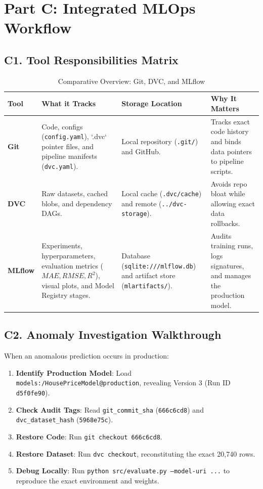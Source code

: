 \documentclass[11pt,a4paper]{article}
\begin{document}
\section{Part C: Integrated MLOps Workflow}

\subsection{C1. Tool Responsibilities Matrix}

\begin{table}[htbp]
\centering
\small
\caption{Comparative Overview: Git, DVC, and MLflow}
\begin{tabularx}{\textwidth}{l X X X}
\toprule
\textbf{Tool} & \textbf{What it Tracks} & \textbf{Storage Location} & \textbf{Why It Matters} \\
\midrule
\textbf{Git} & Code, configs (\texttt{config.yaml}), `.dvc` pointer files, and pipeline manifests (\texttt{dvc.yaml}). & Local repository (\texttt{.git/}) and GitHub. & Tracks exact code history and binds data pointers to pipeline scripts. \\
\textbf{DVC} & Raw datasets, cached blobs, and dependency DAGs. & Local cache (\texttt{.dvc/cache}) and remote (\texttt{../dvc-storage}). & Avoids repo bloat while allowing exact data rollbacks. \\
\textbf{MLflow} & Experiments, hyperparameters, evaluation metrics ($MAE, RMSE, R^2$), visual plots, and Model Registry stages. & Database (\texttt{sqlite:///mlflow.db}) and artifact store (\texttt{mlartifacts/}). & Audits training runs, logs signatures, and manages the production model. \\
\bottomrule
\end{tabularx}
\end{table}

\subsection{C2. Anomaly Investigation Walkthrough}
When an anomalous prediction occurs in production:
\begin{enumerate}
    \item \textbf{Identify Production Model}: Load \texttt{models:/HousePriceModel@production}, revealing Version 3 (Run ID \texttt{d5f0fe90}).
    \item \textbf{Check Audit Tags}: Read \texttt{git\_commit\_sha} (\texttt{666c6cd8}) and \texttt{dvc\_dataset\_hash} (\texttt{5968e75c}).
    \item \textbf{Restore Code}: Run \texttt{git checkout 666c6cd8}.
    \item \textbf{Restore Dataset}: Run \texttt{dvc checkout}, reconstituting the exact 20,740 rows.
    \item \textbf{Debug Locally}: Run \texttt{python src/evaluate.py --model-uri ...} to reproduce the exact environment and weights.
\end{enumerate}
\end{document}
